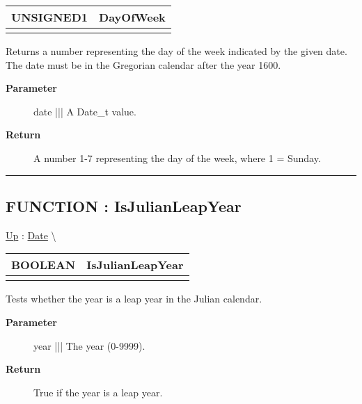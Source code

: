 {\renewcommand{\arraystretch}{1.5}
\begin{tabularx}{\textwidth}{|>{\raggedright\arraybackslash}l|X|}
\hline
\hspace{0pt}UNSIGNED1 & DayOfWeek \\
\hline
\multicolumn{2}{|>{\raggedright\arraybackslash}X|}{\hspace{0pt}(Date\_t date)} \\
\hline
\end{tabularx}
}

\par
Returns a number representing the day of the week indicated by the given date. The date must be in the Gregorian calendar after the year 1600.

\par
\begin{description}
\item [\textbf{Parameter}] date ||| A Date\_t value.
\item [\textbf{Return}] A number 1-7 representing the day of the week, where 1 = Sunday.
\end{description}

\rule{\linewidth}{0.5pt}
\subsection*{FUNCTION : IsJulianLeapYear}
\hypertarget{ecldoc:date.isjulianleapyear}{}
\hyperlink{ecldoc:Date}{Up} :
\hspace{0pt} \hyperlink{ecldoc:Date}{Date} \textbackslash 

{\renewcommand{\arraystretch}{1.5}
\begin{tabularx}{\textwidth}{|>{\raggedright\arraybackslash}l|X|}
\hline
\hspace{0pt}BOOLEAN & IsJulianLeapYear \\
\hline
\multicolumn{2}{|>{\raggedright\arraybackslash}X|}{\hspace{0pt}(INTEGER2 year)} \\
\hline
\end{tabularx}
}

\par
Tests whether the year is a leap year in the Julian calendar.

\par
\begin{description}
\item [\textbf{Parameter}] year ||| The year (0-9999).
\item [\textbf{Return}] True if the year is a leap year.
\end{description}

